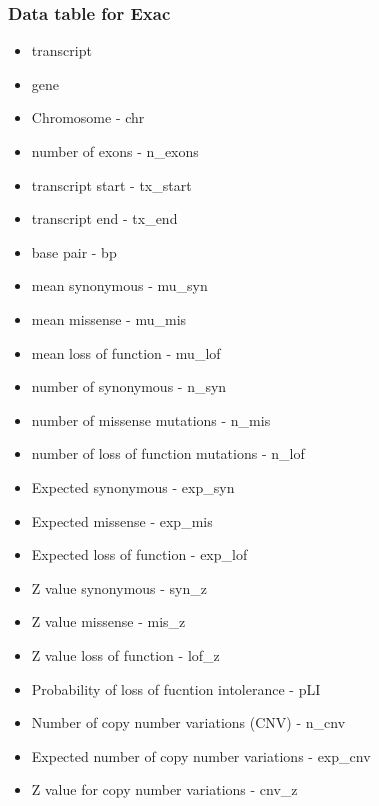 \subsubsection{Data table for Exac}
\label{sec:supplemental data table for exac}
\begin{itemize}
    \item { transcript}
    \item{gene}
    \item{Chromosome - chr}
    \item{number of exons - n\_exons}
    \item{transcript start - tx\_start}
    \item{transcript end - tx\_end}
    \item{base pair - bp}
    \item{mean synonymous - mu\_syn}
    \item{mean missense - mu\_mis}
    \item{mean loss of function - mu\_lof}
    \item{number of synonymous - n\_syn}
    \item{number of missense mutations - n\_mis}
    \item{number of loss of function mutations - n\_lof}
    \item{Expected synonymous - exp\_syn}
    \item{Expected missense - exp\_mis}
    \item{Expected loss of function - exp\_lof}
    \item{Z value synonymous - syn\_z}
    \item{Z value missense - mis\_z}
    \item{Z value loss of function - lof\_z}
    \item{Probability of loss of fucntion intolerance - pLI}
    \item{Number of copy number variations (CNV) - n\_cnv}
    \item{Expected number of copy number variations - exp\_cnv}
    \item{Z value for copy number variations - cnv\_z}
    
\end{itemize}